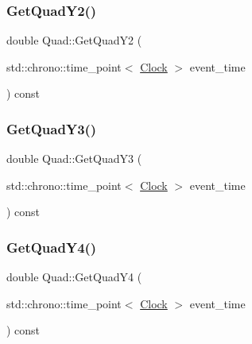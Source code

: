 \mbox{\label{classQuad_a8f10730993f6c6310f18431a81fb352a}} 
\subsubsection{\texorpdfstring{Get\+Quad\+Y2()}{GetQuadY2()}}
{\footnotesize\ttfamily double Quad\+::\+Get\+Quad\+Y2 (\begin{DoxyParamCaption}\item[{std\+::chrono\+::time\+\_\+point$<$ \mbox{\hyperlink{universe_8h_a0ef8d951d1ca5ab3cfaf7ab4c7a6fd80}{Clock}} $>$}]{event\+\_\+time }\end{DoxyParamCaption}) const\hspace{0.3cm}{\ttfamily [inline]}}

\mbox{\label{classQuad_a9cdb9ea12e3aa3eb0e471015d4cb46bb}} 
\subsubsection{\texorpdfstring{Get\+Quad\+Y3()}{GetQuadY3()}}
{\footnotesize\ttfamily double Quad\+::\+Get\+Quad\+Y3 (\begin{DoxyParamCaption}\item[{std\+::chrono\+::time\+\_\+point$<$ \mbox{\hyperlink{universe_8h_a0ef8d951d1ca5ab3cfaf7ab4c7a6fd80}{Clock}} $>$}]{event\+\_\+time }\end{DoxyParamCaption}) const\hspace{0.3cm}{\ttfamily [inline]}}

\mbox{\label{classQuad_aff3097e4988549376102daf18b582a0b}} 
\subsubsection{\texorpdfstring{Get\+Quad\+Y4()}{GetQuadY4()}}
{\footnotesize\ttfamily double Quad\+::\+Get\+Quad\+Y4 (\begin{DoxyParamCaption}\item[{std\+::chrono\+::time\+\_\+point$<$ \mbox{\hyperlink{universe_8h_a0ef8d951d1ca5ab3cfaf7ab4c7a6fd80}{Clock}} $>$}]{event\+\_\+time }\end{DoxyParamCaption}) const\hspace{0.3cm}{\ttfamily [inline]}}

